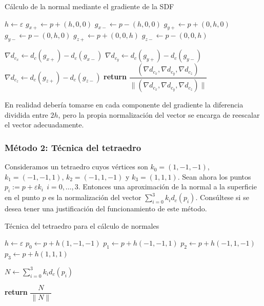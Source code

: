 \begin{algorithm}[H]
    \caption{Cálculo de la normal mediante el gradiente de la SDF} \label{alg:normal-gradiente-sdf}
    \begin{algorithmic}
    \State $h\gets\varepsilon$
    \State $g_{x+}\gets p + (h,0,0)$
    \State $g_{x-}\gets p - (h,0,0)$
    \State $g_{y+}\gets p + (0,h,0)$
    \State $g_{y-}\gets p - (0,h,0)$
    \State $g_{z+}\gets p + (0,0,h)$
    \State $g_{z-}\gets p - (0,0,h)$

    \State $\nabla d_{c_x} \gets d_c(g_{x+})-d_c(g_{x-})$
    \State $\nabla d_{c_y} \gets d_c(g_{y+})-d_c(g_{y-})$
    \State $\nabla d_{c_z} \gets d_c(g_{z+})-d_c(g_{z-})$
        \State \textbf{return} $\dfrac{(\nabla d_{c_x},\nabla d_{c_y},\nabla d_{c_z})}{\|(\nabla d_{c_x},\nabla d_{c_y},\nabla d_{c_z})\|}$
    \end{algorithmic}
\end{algorithm}

En realidad debería tomarse en cada componente del gradiente la diferencia dividida entre $2h$, pero la propia normalización del vector se encarga de reescalar el vector adecuadamente.    

\subsubsection{Método 2: Técnica del tetraedro}

Consideramos un tetraedro cuyos vértices son $k_0=(1,-1,-1)$, $k_1=(-1,-1,1)$, $k_2=(-1,1,-1)$ y $k_3=(1,1,1)$. Sean ahora los puntos $p_i := p+\varepsilon k_i\ \ i=0,\dots,3$. Entonces una aproximación de la normal a la superficie en el punto $p$ es la normalización del vector $\sum_{i=0}^3 k_i d_c(p_i)$. Consúltese \cite{normals-sdf} si se desea tener una justificación del funcionamiento de este método.

\begin{algorithm}[H]
    \caption{Técnica del tetraedro para el cálculo de normales} \label{alg:normal-tetraedro}
    \begin{algorithmic}
    \State $h\gets\varepsilon$
    \State $p_0 \gets p + h(1,-1,-1)$
    \State $p_1 \gets p + h(-1,-1,1)$
    \State $p_2 \gets p + h(-1,1,-1)$
    \State $p_3 \gets p + h(1,1,1)$

    \State $N\gets \sum_{i=0}^3 k_i d_c(p_i)$

    \State \textbf{return} $\dfrac{N}{\|N\|}$
    \end{algorithmic}
\end{algorithm}

